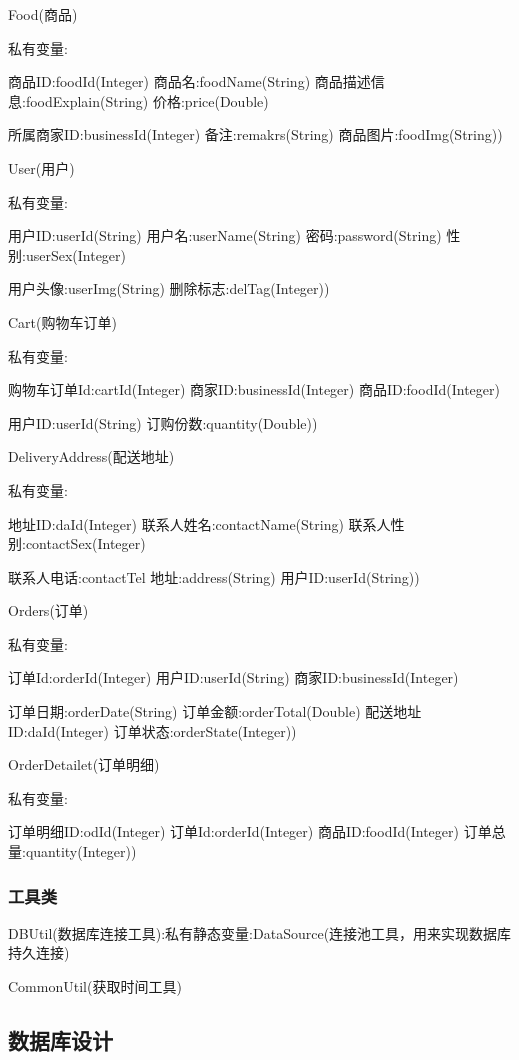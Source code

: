 Food(商品) 

私有变量:

商品ID:foodId(Integer)  商品名:foodName(String)  商品描述信息:foodExplain(String)  价格:price(Double)  

所属商家ID:businessId(Integer)  备注:remakrs(String)  商品图片:foodImg(String))



User(用户)

私有变量:

用户ID:userId(String)  用户名:userName(String)  密码:password(String)  性别:userSex(Integer)

用户头像:userImg(String)  删除标志:delTag(Integer))



Cart(购物车订单)

私有变量:

购物车订单Id:cartId(Integer)  商家ID:businessId(Integer)  商品ID:foodId(Integer)  

用户ID:userId(String)  订购份数:quantity(Double))



DeliveryAddress(配送地址)

私有变量:

地址ID:daId(Integer)  联系人姓名:contactName(String)  联系人性别:contactSex(Integer)


联系人电话:contactTel  地址:address(String)  用户ID:userId(String))



Orders(订单)

私有变量:

订单Id:orderId(Integer)  用户ID:userId(String)  商家ID:businessId(Integer)


订单日期:orderDate(String)  订单金额:orderTotal(Double)  配送地址ID:daId(Integer)  订单状态:orderState(Integer))



OrderDetailet(订单明细)

私有变量:

订单明细ID:odId(Integer)  订单Id:orderId(Integer)  商品ID:foodId(Integer)  订单总量:quantity(Integer))

\subsubsection{工具类}
DBUtil(数据库连接工具):私有静态变量:DataSource(连接池工具，用来实现数据库持久连接)

CommonUtil(获取时间工具)
\subsection{数据库设计}


